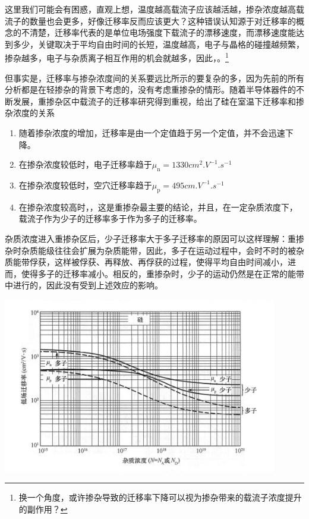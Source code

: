 这里我们可能会有困惑，直观上想，温度越高载流子应该越活越，掺杂浓度越高载流子的数量也会更多，好像迁移率反而应该更大？这种错误认知源于对迁移率的概念的不清楚，迁移率代表的是单位电场强度下载流子的漂移速度，而漂移速度能达到多少，关键取决于平均自由时间的长短，温度越高，电子与晶格的碰撞越频繁，掺杂越多，电子与杂质离子相互作用的机会就越多，因此，。\footnote{换一个角度，或许掺杂导致的迁移率下降可以视为掺杂带来的载流子浓度提升的副作用？}

但事实是，迁移率与掺杂浓度间的关系要远比所示的要复杂的多，因为先前的所有分析都是在轻掺杂的背景下考虑的，没有考虑重掺杂的情形。随着半导体器件的不断发展，重掺杂区中载流子的迁移率研究得到重视，给出了硅在室温下迁移率和掺杂浓度的关系
\begin{enumerate}
    \item 随着掺杂浓度的增加，迁移率是由一个定值趋于另一个定值，并不会迅速下降。
    \item 在掺杂浓度较低时，电子迁移率趋于$\mu_\text{n}=1330\si{cm^2.V^{-1}.s^{-1}}$
    \item 在掺杂浓度较低时，空穴迁移率趋于$\mu_\text{p}=495\si{cm.V^{-1}.s^{-1}}$
    \item 在掺杂浓度较高时，，这是重掺杂最主要的结论，并且，在一定杂质浓度下，载流子作为少子的迁移率多于作为多子的迁移率。
\end{enumerate}

杂质浓度进入重掺杂区后，少子迁移率大于多子迁移率的原因可以这样理解：重掺杂时杂质能级往往会扩展为杂质能带，因此，多子在运动过程中，会时不时的被杂质能带俘获，这样被俘获、再释放、再俘获的过程，使得平均自由时间减小，进而，使得多子的迁移率减小。相反的，重掺杂时，少子的运动仍然是在正常的能带中进行的，因此没有受到上述效应的影响。

\begin{Figure}[硅的迁移率和掺杂浓度的关系]
    \includegraphics[width=12cm]{image/mu_N.jpg}
\end{Figure}


